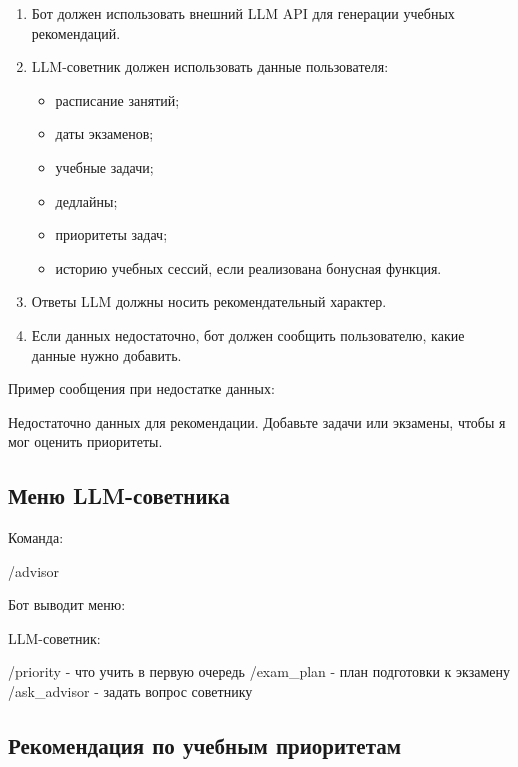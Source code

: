 \documentclass[10pt,a4paper,final]{article} %
\begin{document}
\begin{enumerate}[label=\arabic*.]
    \item Бот должен использовать внешний LLM API для генерации учебных рекомендаций.
    \item LLM-советник должен использовать данные пользователя:
    \begin{itemize}
        \item расписание занятий;
        \item даты экзаменов;
        \item учебные задачи;
        \item дедлайны;
        \item приоритеты задач;
        \item историю учебных сессий, если реализована бонусная функция.
    \end{itemize}
    \item Ответы LLM должны носить рекомендательный характер.
    \item Если данных недостаточно, бот должен сообщить пользователю, какие данные нужно добавить.
\end{enumerate}

Пример сообщения при недостатке данных:

\begin{Code}
Недостаточно данных для рекомендации. Добавьте задачи или экзамены, чтобы я мог оценить приоритеты.
\end{Code}

\subsection{Меню LLM-советника}

Команда:

\begin{Code}
/advisor
\end{Code}

Бот выводит меню:

\begin{Code}
LLM-советник:

/priority - что учить в первую очередь
/exam_plan - план подготовки к экзамену
/ask_advisor - задать вопрос советнику
\end{Code}

\subsection{Рекомендация по учебным приоритетам}
\end{document}
